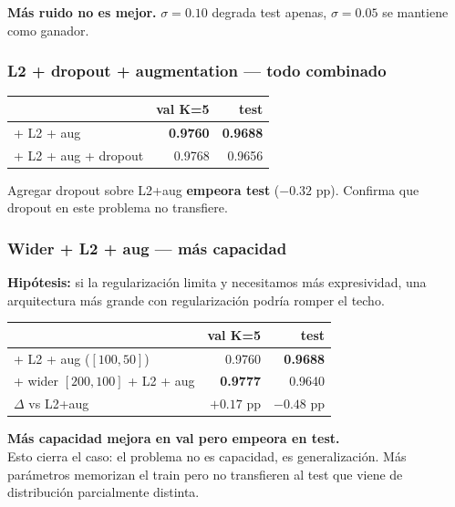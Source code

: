 \documentclass[11pt,a4paper]{article}
\begin{document}
\textbf{Más ruido no es mejor.} $\sigma=0.10$ degrada test apenas, $\sigma=0.05$ se mantiene como ganador.

\subsubsection{L2 + dropout + augmentation — todo combinado}

\begin{center}
\small
\begin{tabular}{@{}lrr@{}}
\toprule
& \textbf{val K=5} & \textbf{test} \\
\midrule
+ L2 + aug                 & \textbf{0.9760} & \textbf{0.9688} \\
+ L2 + aug + dropout       & 0.9768 & 0.9656 \\
\bottomrule
\end{tabular}
\end{center}

Agregar dropout sobre L2+aug \textbf{empeora test} ($-0.32$ pp). Confirma que dropout en este problema no transfiere.

\subsubsection{Wider + L2 + aug — más capacidad}

\textbf{Hipótesis:} si la regularización limita y necesitamos más expresividad, una arquitectura más grande con regularización podría romper el techo.

\begin{center}
\small
\begin{tabular}{@{}lrr@{}}
\toprule
& \textbf{val K=5} & \textbf{test} \\
\midrule
+ L2 + aug ($[100,50]$)    & 0.9760 & \textbf{0.9688} \\
+ wider $[200,100]$ + L2 + aug & \textbf{0.9777} & 0.9640 \\
$\Delta$ vs L2+aug          & $+0.17$ pp & $-0.48$ pp \\
\bottomrule
\end{tabular}
\end{center}

\begin{sorpresa}
\textbf{Más capacidad mejora en val pero empeora en test.} \\[0.2em]
Esto cierra el caso: el problema no es capacidad, es generalización. Más parámetros memorizan el train pero no transfieren al test que viene de distribución parcialmente distinta.
\end{sorpresa}
\end{document}
